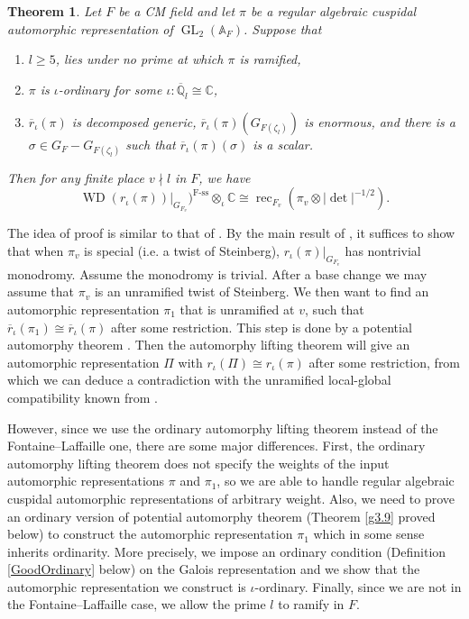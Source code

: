 \documentclass[10pt]{article}
\newtheorem{theorem}{Theorem}[section]
\theoremstyle{definition}
\numberwithin{equation}{theorem}
\newcommand{\AAA}{\mathbb{A}}
\newcommand{\CC}{\mathbb{C}}
\newcommand{\QQ}{\mathbb{Q}}
\DeclareMathOperator{\Fss}{F-ss}
\DeclareMathOperator{\GL}{GL}
\DeclareMathOperator{\rec}{rec}
\DeclareMathOperator{\WD}{WD}
\begin{document}
\begin{theorem}
Let $F$ be a CM field and let $\pi$ be a regular algebraic cuspidal automorphic representation of $\GL_2(\AAA_F)$. Suppose that 
\begin{enumerate}
    \item $l\ge5$, lies under no prime at which $\pi$ is ramified,
    \item $\pi$ is $\iota$-ordinary for some $\iota:\overline{\QQ}_l\cong\CC$,
    \item $\overline{r}_{\iota}(\pi)$ is decomposed generic, $\overline{r}_{\iota}(\pi)(G_{F(\zeta_l)})$ is enormous, and there is a $\sigma\in G_F-G_{F(\zeta_l)}$ such that $\overline{r}_{\iota}(\pi)(\sigma)$ is a scalar.
\end{enumerate}
Then for any finite place $v\nmid l$ in $F$, we have
$$\WD(r_{\iota}(\pi))|_{G_{F_v}})^{\Fss}\otimes_\iota\CC\cong\rec_{F_v}(\pi_v\otimes|\det|^{-1/2}).$$
\end{theorem}

The idea of proof is similar to that of \cite[Theorem~4.1]{AN19}. By the main result of \cite{Var14}, it suffices to show that when $\pi_v$ is special (i.e. a twist of Steinberg), $r_{\iota}(\pi)|_{G_{F_v}}$ has nontrivial monodromy. Assume the monodromy is trivial. After a base change we may assume that $\pi_v$ is an unramified twist of Steinberg. We then want to find an automorphic representation $\pi_1$ that is unramified at $v$, such that $\overline{r}_{\iota}(\pi_1)\cong\overline{r}_{\iota}(\pi)$ after some restriction. This step is done by a potential automorphy theorem \cite[Theorem~3.9]{AN19}. Then the automorphy lifting theorem will give an automorphic representation $\Pi$ with $r_{\iota}(\Pi)\cong r_{\iota}(\pi)$ after some restriction, from which we can deduce a contradiction with the unramified local-global compatibility known from \cite{HLTT16,Var14}.

However, since we use the ordinary automorphy lifting theorem instead of the Fontaine--Laffaille one, there are some major differences. First, the ordinary automorphy lifting theorem does not specify the weights of the input automorphic representations $\pi$ and $\pi_1$, so we are able to handle regular algebraic cuspidal automorphic representations of arbitrary weight. Also, we need to prove an ordinary version of potential automorphy theorem (Theorem \ref{g3.9} proved below) to construct the automorphic representation $\pi_1$ which in some sense inherits ordinarity. More precisely, we impose an ordinary condition (Definition \ref{GoodOrdinary} below) on the Galois representation and we show that the automorphic representation we construct is $\iota$-ordinary. Finally, since we are not in the Fontaine--Laffaille case, we allow the prime $l$ to ramify in $F$.
\end{document}
